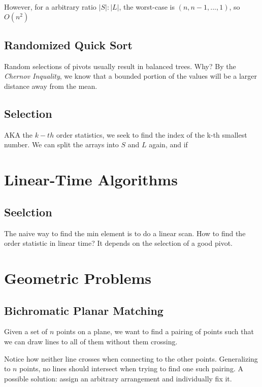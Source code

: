 \documentclass[portrait,10pt, a4paper]{article}
\begin{document}
\begin{multicols*}{3}
		However, for a arbitrary ratio  $|S|:|L|$, the worst-case is $(n,n-1,...,1)$, so $O(n^{2})$
	\subsection{Randomized Quick Sort}
		Random selections of pivots usually result in balanced trees. Why? By the \textit{Chernov Inquality}, we
		know that a bounded portion of the values will be a larger distance away from the mean.
	\subsection{Selection}
		AKA the $k-th$ order statistics, we seek to find the index of the k-th smallest number. We can split
		the arrays into $S$ and $L$ again, and if 
\section{Linear-Time Algorithms}
	\subsection{Seelction}
		The naive way to find the min element is to do a linear scan. How to find the order statistic in linear 
		time? It depends on the selection of a good pivot. 
\section{Geometric Problems}
	\subsection{Bichromatic Planar Matching}
		Given  a set of $n$ points on a plane, we want to find a pairing of points such that we can draw lines 
		to all of them without them crossing.

			
		Notice how neither line crosses when connecting to the other points. Generalizing to $n$ points, no lines
		should intersect when trying to find one such pairing. A possible solution: assign an arbitrary 
		arrangement and individually fix it.
\end{multicols*}
\end{document}
